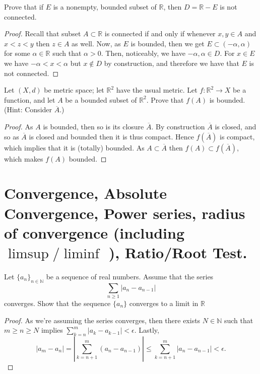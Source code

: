 \documentclass[oneside]{amsart}
\theoremstyle{definition}
\newcommand{\rr}{\mathbb R}
\newcommand{\nn}{\mathbb N}
\begin{document}
\begin{tcolorbox}[colback=black!5!white,colframe=black!75!black,title= Exercise $3.3.$] Prove that if $E$ is a nonempty, bounded subset of $\rr$, then $D = \rr - E$ is not connected.
\tcblower 
\begin{proof}Recall that subset $A \subset \rr$ is connected if and only if whenever $x,y \in A$ and $x<z<y$ then $z \in A$ as well. Now, as $E$ is bounded, then we get $E \subset (-\alpha, \alpha) $ for some $\alpha \in \rr$ such that $\alpha > 0$. Then, noticeably, we have $-\alpha, \alpha \in D$. For $x \in E$ we have $-\alpha < x < \alpha$ but $x \notin D$ by construction, and therefore we have that $E$ is not connected.
\end{proof} 
\end{tcolorbox}


\begin{tcolorbox}[colback=black!5!white,colframe=black!75!black,title= Exercise $3.4.$] Let $(X,d)$ be metric space; let $\rr^2$ have the usual metric. Let $f \colon \rr^2 \to X$ be a function, and let $A$ be a bounded subset of $\rr^2$. Prove that $f(A)$ is bounded. (Hint: Consider $\overline{A}$.)
\tcblower 
\begin{proof} As $A$ is bounded, then so is its closure $\overline{A}$. By construction $\overline{A}$ is closed, and so as $\overline{A}$ is closed and bounded then it is thus compact. Hence $f(\overline{A})$ is compact, which implies that it is (totally) bounded. As $A\subset \overline{A}$ then $f(A) \subset f(\overline{A})$, which makes $f(A)$ bounded.  
\end{proof} 
\end{tcolorbox}


\newpage
\section{Convergence, Absolute Convergence, Power series, radius of convergence (including $\limsup/ \liminf$ ), Ratio/Root
Test.}

\begin{tcolorbox}[colback=black!5!white,colframe=black!75!black,title= Exercise $4.1.$] Let $ \{ a_n\}_{n \in \nn}$ be a sequence of real numbers. Assume that the series $$\sum_{n \geq 1} |a_n - a_{n-1}|$$ converges. Show that the sequence $\{ a_n \}$ converges to a limit in $\rr$
\tcblower 
\begin{proof} As we're assuming the series converges, then there exists $N \in \nn$ such that $m \geq n \geq N$ implies $ \sum_{k=n}^m |a_k - a_{k-1}|< \epsilon$. Lastly, \[ |a_m -a_n | = \left | \sum_{k=n+1}^m (a_n-a_{n-1}) \right| \leq   \sum_{k=n+1}^m |a_n-a_{n-1}| < \epsilon .\]
\end{proof}
\end{tcolorbox}
\end{document}
